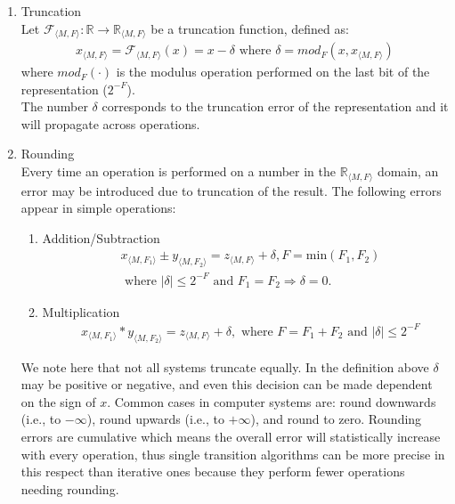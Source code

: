 \documentclass[sigconf]{llncs}
\begin{document}
\begin{enumerate}
\item Truncation\\
Let $\mathcal{F}_{\langle M,F \rangle} : \mathbb{R} \rightarrow \mathbb{R}_{\langle M,F \rangle}$
be a truncation function, defined as:
\begin{align*}
x_{\langle M,F \rangle}=\mathcal{F}_{\langle M,F \rangle}(x) = x-\delta \text{ where } \delta=mod_F(x, x_{\langle M,F \rangle})
\end{align*} 
where $mod_F(\cdot)$ is the modulus operation performed on the last bit of the representation ($2^{-F}$).\\
The number $\delta$ corresponds to the truncation error of the representation and it will propagate across operations.
\item Rounding\\
Every time an operation is performed on a number in the $\mathbb{R}_{\langle M,F \rangle}$ domain, an error may be
introduced due to truncation of the result. 
The following errors appear in simple operations:
\begin{enumerate}
\item Addition/Subtraction
\begin{align*}
&x_{\langle M,F_1\rangle} \pm y_{\langle M,F_2\rangle}=z_{\langle M,F\rangle} + \delta,  F=\text{min}(F_1,F_2)\\
&\text{ where } |\delta| \leq 2^{-F} \text{ and } F_1=F_2 \Rightarrow \delta=0.
\end{align*}
\item Multiplication
\begin{align*}
&x_{\langle M,F_1\rangle} * y_{\langle M,F_2\rangle}=z_{\langle M,F\rangle} + \delta, \text{ where } F=F_1+F_2 \text{ and } |\delta| \leq 2^{-F}
\end{align*}
\end{enumerate}
%
We note here that not all systems truncate equally.  In the definition above
$\delta$ may be positive or negative, and even this decision can be made
dependent on the sign of $x$.  Common cases in computer systems are: round
downwards (i.e., to $-\infty$), round upwards (i.e., to $+\infty$), and
round to zero.  Rounding errors are cumulative which means the overall error
will statistically increase with every operation, thus single transition
algorithms can be more precise in this respect than iterative ones because
they perform fewer operations needing rounding.


\end{enumerate}
\end{document}
